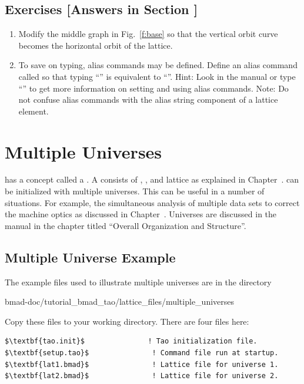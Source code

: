 \documentclass{hitec}     %
\newcommand{\Section}[1]{\section{#1}\vspace*{-1ex}}
\begin{document}
\vspace{1in}

\subsection{Exercises [Answers in Section ]}
\label{s:three.lat.ex}

\begin{enumerate}[label=\thesection.\arabic{enumi}]
\item
Modify the middle graph in Fig.~\ref{f:base} so that the vertical orbit curve becomes the horizontal
orbit of the  lattice.
\item
To save on typing, alias commands may be defined. Define an alias command called  so that
typing ``'' is equivalent to ``''. Hint: Look in the
manual or type ``'' to get more information on setting and using alias commands.
Note: Do not confuse \tao alias commands with the alias string component of a lattice element.
\end{enumerate}

\newpage

\Section{Multiple Universes}
\label{s:multi.uni}

\tao has a concept called a . A  consists of , , and
 lattice as explained in Chapter~. \tao can be initialized with multiple
universes. This can be useful in a number of situations. For example, the simultaneous analysis of
multiple data sets to correct the machine optics as discussed in Chapter~.
Universes are discussed in the \tao manual in the chapter titled ``Overall Organization and Structure''.

\subsection{Multiple Universe Example}

The example files used to illustrate multiple universes are in the directory 
\begin{code}
bmad-doc/tutorial_bmad_tao/lattice_files/multiple_universes
\end{code}
Copy these files to your working directory. There are four files here:
\begin{lstlisting}[mathescape]
$\textbf{tao.init}$               ! Tao initialization file.
$\textbf{setup.tao}$               ! Command file run at startup.
$\textbf{lat1.bmad}$               ! Lattice file for universe 1.
$\textbf{lat2.bmad}$               ! Lattice file for universe 2.
\end{lstlisting}
\end{document}
